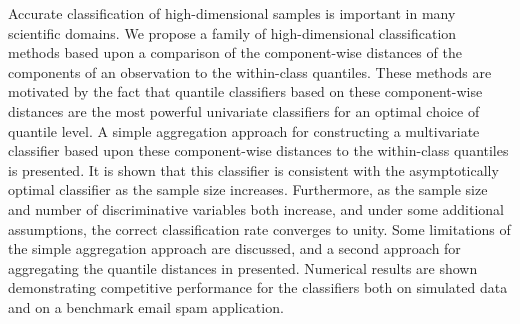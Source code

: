 
Accurate classification of high-dimensional samples is important in many
scientific domains.  We propose a family of high-dimensional classification
methods based upon a comparison of the component-wise distances of the
components of an observation to the within-class quantiles.  These methods are
motivated by the fact that quantile classifiers based on these component-wise
distances are the most powerful univariate classifiers for an optimal choice of
quantile level.  A simple aggregation approach for constructing a multivariate
classifier based upon these component-wise distances to the within-class
quantiles is presented.  It is shown that this classifier is consistent with the
asymptotically optimal classifier as the sample size increases.  Furthermore, as
the sample size and number of discriminative variables both increase, and under
some additional assumptions, the correct classification rate converges to unity.
Some limitations of the simple aggregation approach are discussed, and a second
approach for aggregating the quantile distances in presented.  Numerical results
are shown demonstrating competitive performance for the classifiers both on
simulated data and on a benchmark email spam application.




